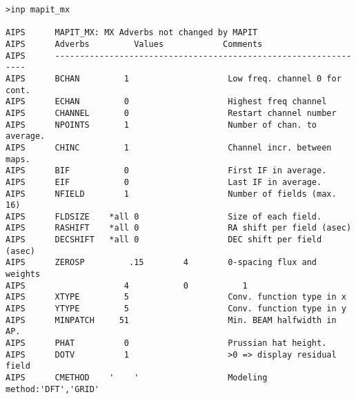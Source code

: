 \begin{verbatim}
>inp mapit_mx

AIPS      MAPIT_MX: MX Adverbs not changed by MAPIT
AIPS      Adverbs         Values            Comments
AIPS      ----------------------------------------------------------------
AIPS      BCHAN         1                    Low freq. channel 0 for cont.
AIPS      ECHAN         0                    Highest freq channel
AIPS      CHANNEL       0                    Restart channel number
AIPS      NPOINTS       1                    Number of chan. to average.
AIPS      CHINC         1                    Channel incr. between maps.
AIPS      BIF           0                    First IF in average.
AIPS      EIF           0                    Last IF in average.
AIPS      NFIELD        1                    Number of fields (max. 16)
AIPS      FLDSIZE    *all 0                  Size of each field.
AIPS      RASHIFT    *all 0                  RA shift per field (asec)
AIPS      DECSHIFT   *all 0                  DEC shift per field (asec)
AIPS      ZEROSP         .15        4        0-spacing flux and weights
AIPS                    4           0           1
AIPS      XTYPE         5                    Conv. function type in x
AIPS      YTYPE         5                    Conv. function type in y
AIPS      MINPATCH     51                    Min. BEAM halfwidth in AP.
AIPS      PHAT          0                    Prussian hat height.
AIPS      DOTV          1                    >0 => display residual field
AIPS      CMETHOD    '    '                  Modeling method:'DFT','GRID'

\end{verbatim}

